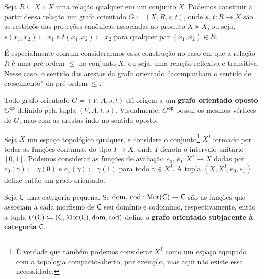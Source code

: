 \begin{exem}\label{exem:grafo_orientado_via_relacao}
    Seja $R \subseteq X \times X$ uma relação qualquer em um conjunto $X$.
    Podemos construir a partir dessa relação um grafo orientado $G \coloneqq (X,R,s,t)$, onde $s,\,t: R \to X$ são as restriçõs das projeções canônicas associadas ao produto $X \times X$, ou seja, $s(x_1,x_2) \coloneqq x_1$ e $t(x_1,x_2) \coloneqq x_2$ para qualquer par $(x_1,x_2) \in R$.

    É especialmente comum considerarmos essa construção no caso em que a relação $R$ é uma pré-ordem $\leq$ no conjunto $X$, ou seja, uma relação reflexiva e transitiva.
    Nesse caso, o sentido das arestas da grafo orientado ``acompanham o sentido de crescimento'' da pré-ordem $\leq$.
\end{exem}

\begin{exem}\label{exem:grafo_orientado_oposto}
    Todo grafo orientado $G=(V,A,s,t)$ dá origem a um \textbf{grafo orientado oposto} $G^{\mathsf{op}}$ definido pela tupla $(V,A,t,s)$.
    Visualmente, $G^{\mathsf{op}}$ possui os mesmos vértices de $G$, mas com as arestas indo no sentido oposto.
\end{exem}

\begin{exem}\label{exem:grafo_orientado_via_espaco_top}
    Seja $X$ um espaço topológico qualquer, e considere o conjunto\footnote{É verdade que também podemos considerar $X^I$ como um espaço equipado com a topologia compacto-aberto, por exemplo, mas aqui não existe essa necessidade.} $X^I$ formado por todas as funções contínuas do tipo $I \to X$, onde $I$ denota o intervalo unitário $[0,1]$.
    Podemos considerar as funções de avaliação $e_0,\, e_1: X^I \to X$ dadas por $e_0(\gamma) \coloneqq \gamma(0)$ e $e_1(\gamma) \coloneqq \gamma(1)$ para todo $\gamma \in X^{I}$.
    A tupla $(X,X^I,e_0,e_1)$ define então um grafo orientado.
\end{exem}

\begin{exem}\label{exem:grafo_orientado_subjacente_categoria}
    Seja $\mathsf{C}$ uma categoria pequena.
    Se $\mathrm{dom},\,\mathrm{cod}: \mathrm{Mor}(\mathsf{C}) \to \mathsf{C}$ são as funções que associam a cada morfismo de $\mathsf{C}$ seu domínio e codomínio, respectivamente, então a tupla $U(\mathsf{C}) \coloneqq (\mathsf{C},\mathrm{Mor}(\mathsf{C}),\mathrm{dom},\mathrm{cod})$ define o \textbf{grafo orientado subjacente à categoria} $\mathsf{C}$.
\end{exem}

